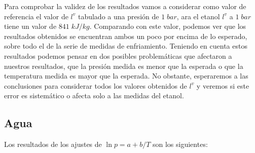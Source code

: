 \documentclass[a4paper,12pt,titlepage]{article}
\begin{document}
Para comprobar la validez de los resultados vamos a considerar como valor de referencia el valor de $l^v$ tabulado a una presión de $1\; bar$, ara el etanol $l^v$ a $1\;bar$ tiene un valor de $841\; kJ/kg$. Comparando con este valor, podemos ver que los resultados obtenidos se encuentran ambos un poco por encima de lo esperado, sobre todo el de la serie de medidas de enfriamiento. Teniendo en cuenta estos resultados podemos pensar en dos posibles problemáticas que afectaron a nuestros resultados, que la presión medida es menor que la esperada o que la temperatura medida es mayor que la esperada. No obstante, esperaremos a las conclusiones para considerar todos los valores obtenidos de $l^v$ y veremos si este error es sistemático o afecta solo a las medidas del etanol.

\subsection{Agua}

Los resultados de los ajustes de $\ln p = a + b/T$ son los siguientes:
\end{document}
